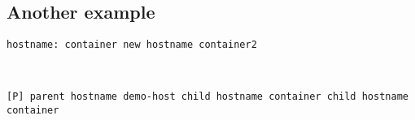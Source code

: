 \subsection{Another example}
\begin{frame}
\begin{minipage}{0.45\textwidth}


\texttt{\newline
[C] hostname: container
\newline
[C] new hostname container2}
\end{minipage}
\
\begin{minipage}{0.45\textwidth}

    
    \texttt{[P] parent hostname demo-host
    \newline
    [P] child hostname container
    \newline
    [P] child hostname container
    }
    \end{minipage}
\end{frame}